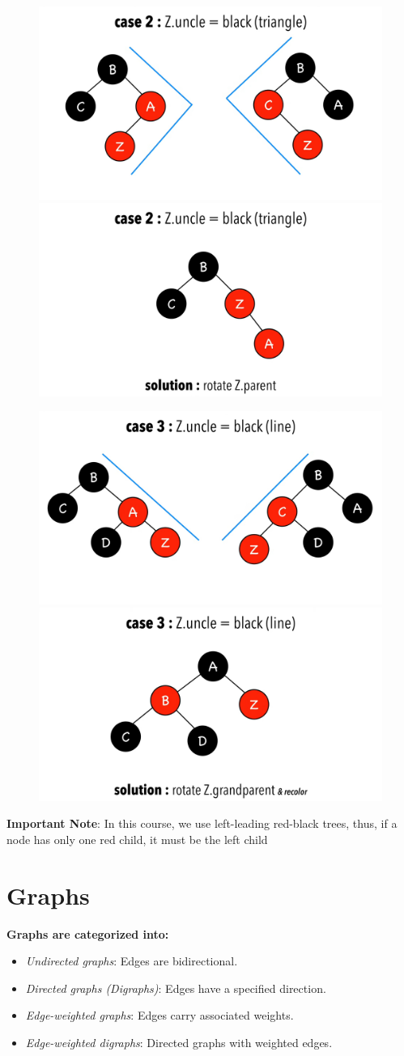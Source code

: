 \documentclass{article}
\begin{document}
\begin{figure}[H]
    \centering
    \includegraphics[width=0.45\linewidth]{images/rb-case-2-before.jpeg}
    \hfill
    \includegraphics[width=0.45\linewidth]{images/rb-case-2-after.jpeg}
\end{figure}

\begin{figure}[H]
    \centering
    \includegraphics[width=0.45\linewidth]{images/rb-case-3-before.jpeg}
    \hfill
    \includegraphics[width=0.45\linewidth]{images/rb-case-3-after.jpeg}
\end{figure}

\textbf{Important Note}: In this course, we use left-leading red-black trees, thus, if a node has only one red child, it must be the left child

\section{Graphs}

\textbf{Graphs are categorized into:}
\begin{itemize}
    \item \textit{Undirected graphs}: Edges are bidirectional.
    \item \textit{Directed graphs (Digraphs)}: Edges have a specified direction.
    \item \textit{Edge-weighted graphs}: Edges carry associated weights.
    \item \textit{Edge-weighted digraphs}: Directed graphs with weighted edges.
\end{itemize}
\end{document}
